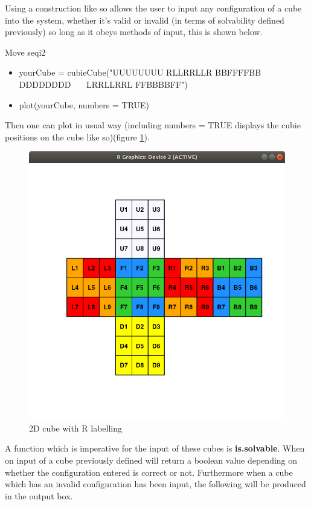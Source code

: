 \documentclass{article}
\begin{document}
\newpage
Using a construction like so allows the user to input any configuration of a cube into the system, whether it's valid or invalid (in terms of solvability defined previously) so long as it obeys methods of input, this is shown below.



\begin{myinput}{Move seq}{i2}
\begin{itemize}
\item yourCube = cubieCube("UUUUUUUU RLLRRLLR BBFFFFBB DDDDDDDD \ \ \ LRRLLRRL FFBBBBFF")
\item plot(yourCube, numbers = TRUE)
\end{itemize}
\end{myinput}

Then one can plot in usual way (including numbers = TRUE displays the cubie positions on the cube like so)(figure \ref{fig:labelled}).
\begin{figure}[h]
	\centering
	\includegraphics[scale=.5]{labelledcube.png}
	\caption{2D cube with R labelling}				    
	\label{fig:labelled}
\end{figure}
\newpage
A function which is imperative for the input of these cubes is \textbf{is.solvable}. When on input of a cube previously defined will return a boolean value depending on whether the configuration entered is correct or not.
Furthermore when a cube which has an invalid configuration has been input, the following will be produced in the output box.
%
\end{document}
